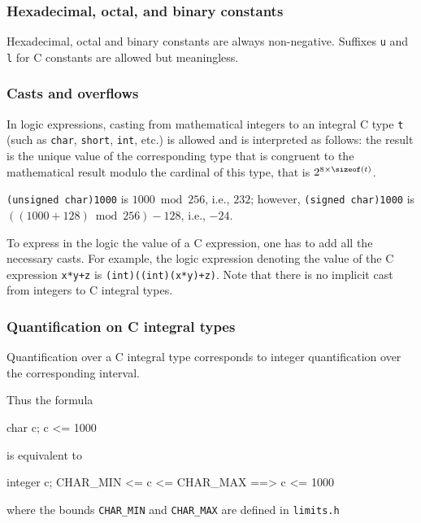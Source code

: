 \subsubsection{Hexadecimal, octal, and binary constants}

Hexadecimal, octal and binary constants are always non-negative. Suffixes
\texttt{u} and \texttt{l} for C constants are allowed but meaningless.

\subsubsection{Casts and  overflows}

In logic expressions, casting from mathematical integers
to an integral C type \lstinline|t| (such as \lstinline|char|,
\lstinline|short|, \lstinline|int|, etc.) is allowed and is
interpreted as follows: the result is the unique value of the
corresponding type that is congruent to the mathematical result modulo
the cardinal of this type, that is $2^{8\times\sizeof(t)}$.
\begin{example}
  \lstinline|(unsigned char)1000| is $1000 \bmod 256$, i.e., $232$;
  however, \lstinline|(signed char)1000| is $((1000+128) \bmod 256) - 128$, i.e., $-24$.
\end{example}

To express in the logic the value of a C
expression, one has to add all the necessary casts. For
example, the logic expression denoting the value of the C expression
\lstinline|x*y+z| is \lstinline|(int)((int)(x*y)+z)|.
Note that there is no implicit cast from integers to C integral types.



\subsubsection{Quantification on C integral types}
\label{sec:quantification}

Quantification over a C integral type corresponds to integer
quantification over the corresponding interval.
\begin{example}
Thus the formula
\begin{listing-nonumber}
\forall char c; c <= 1000
\end{listing-nonumber}
is equivalent to
\begin{listing-nonumber}
\forall integer c; CHAR_MIN <= c <= CHAR_MAX ==> c <= 1000
\end{listing-nonumber}
where the bounds \verb|CHAR_MIN| and \verb|CHAR_MAX| are defined
in \verb|limits.h|
\end{example}


